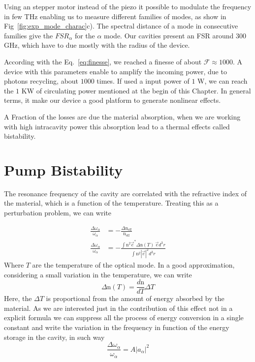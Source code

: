 Using an stepper motor instead of the piezo it possible to modulate the frequency in few THz enabling us to measure different families of modes, as show in Fig~\ref{fig:exp_mode_charac}c). The spectral distance of a mode in consecutive families give the $FSR_\alpha$ for the $\alpha$ mode. Our cavities present an FSR around $300$ GHz, which have to due mostly with the radius of the device. 

According with the Eq.~\ref{eq:finesse}, we reached a finesse of about $\mathcal{F} \approx 1000$. A device with this parameters enable to amplify the incoming power, due to photons recycling, about $1000$ times. If used a input power of $1$ W, we can reach the $1$ KW of circulating power mentioned at the begin of this Chapter. In general terms, it make our device a good platform to generate nonlinear effects. 

A Fraction of the losses are due the material absorption, when we are working with high intracavity power this absorption lead to a thermal effects called bistability. 

\section{Pump Bistability}

The resonance frequency of the cavity are correlated with the refractive index of the material, which is a function of the temperature. Treating this as a perturbation problem, we can write 

\begin{subequations}
    \begin{alignat}{2}
        \frac{\Delta\omega_\alpha}{\omega_\alpha} &= -\frac{\Delta \text{n}_\text{eff}}{\text{n}_\text{eff}}\\
        \frac{\Delta\omega_\alpha}{\omega_\alpha} &= -\frac{\int \text{n}^2\vec{e}^*\Delta\text{n}(T)~\vec{e} d^3r}
        {\int \text{n}^2 |\vec{e}|^2 d^3r}
        \label{eq:termooptc_change}
    \end{alignat}
\end{subequations}
Where $T$ are the temperature of the optical mode. In a good approximation, considering a small variation in the temperature, we can write
\begin{equation}
    \Delta \text{n}(T) = \frac{d\text{n}}{dT}\Delta T
\end{equation}
Here, the $\Delta T$ is proportional from the amount of energy absorbed by the material. As we are interested just in the contribution of this effect not in a explicit formula we can suppress all the process of energy conversion in a single constant and write the variation in the frequency in function of the energy storage in the cavity, in such way
\begin{equation}
\frac{\Delta \omega_\alpha}{\omega_\alpha} = A |a_\alpha|^2
\label{eq:pertubation_bistaliti_cavity}
\end{equation}   

